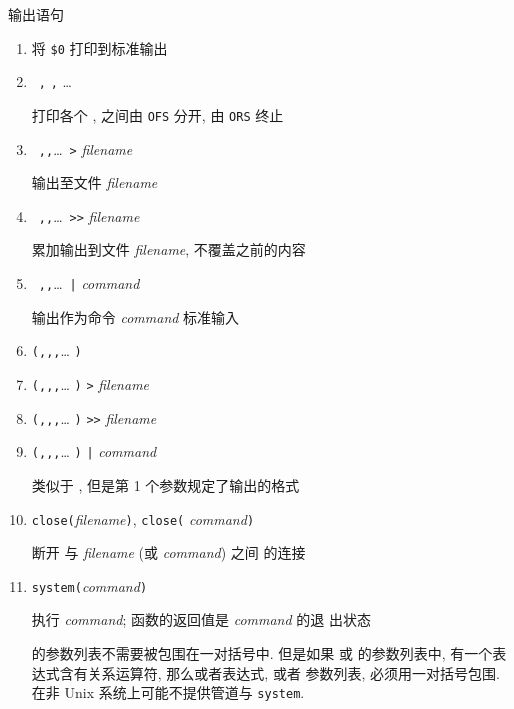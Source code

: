 \begin{summary}{输出语句}
    \begin{enumerate}
        \item \print \par
            将 \verb'$0' 打印到标准输出
        \item \print\ \expr\verb',' \expr\verb',' \ldots \par
            打印各个 \expr, \expr 之间由 \verb'OFS' 分开, 由 \verb'ORS' 
            终止
        \item \print\ \expr\verb','\expr\verb','\ldots\ \verb'>'
            \textit{filename}
            \par 输出至文件 \textit{filename}
        \item \print\ \expr\verb','\expr\verb','\ldots\ \verb'>>'
            \textit{filename}
            \par 累加输出到文件 \textit{filename}, 不覆盖之前的内容
        \item \print\ \expr\verb','\expr\verb','\ldots\ \verb'|'
            \textit{command} \par
            输出作为命令 \textit{command} 标准输入
        \item
            \printf\verb'('\fmt\verb','\expr\verb','\expr\verb','\ldots
            \verb')'
        \item
            \printf\verb'('\fmt\verb','\expr\verb','\expr\verb','\ldots
            \verb')' \verb'>' \textit{filename}
        \item
            \printf\verb'('\fmt\verb','\expr\verb','\expr\verb','\ldots
            \verb')' \verb'>>' \textit{filename}
        \item
            \printf\verb'('\fmt\verb','\expr\verb','\expr\verb','\ldots
            \verb')' \verb'|' \textit{command} \par
            \printf 类似于 \print, 但是第 1 个参数规定了输出的格式
        \item \verb'close('\textit{filename}\verb')', \verb'close('
            \textit{command}\verb')' \par
            断开 \print 与 \textit{filename} (或 \textit{command}) 之间 
            的连接
        \item \verb'system('\textit{command}\verb')' \par
            执行 \textit{command}; 函数的返回值是 \textit{command} 的退 
            出状态

        \printf 的参数列表不需要被包围在一对括号中. 但是如果 \print 或 
        \printf 的参数列表中, 有一个表达式含有关系运算符, 那么或者表达式,
        或者 
        参数列表, 必须用一对括号包围. 在非 Unix 系统上可能不提供管道与 
        \verb'system'.
    \end{enumerate}
\end{summary}

